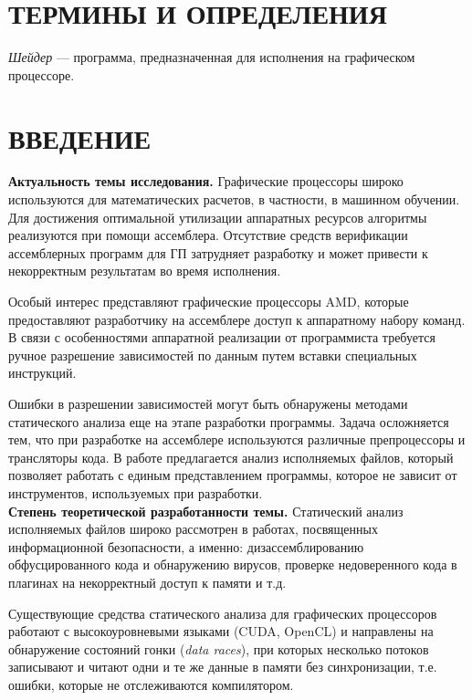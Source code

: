\documentclass[a4paper,14pt]{extarticle}
\newcommand{\topic}[1]{\textbf{#1.}}
\begin{document}
\tableofcontents
\newpage

\section*{ТЕРМИНЫ И ОПРЕДЕЛЕНИЯ}

\textit{Шейдер} — программа, предназначенная для исполнения на графическом процессоре.

\newpage

\section*{ВВЕДЕНИЕ}

\topic{Актуальность темы исследования} Графические процессоры широко используются
для математических расчетов, в частности, в машинном обучении. Для достижения оптимальной
утилизации аппаратных ресурсов алгоритмы реализуются при помощи ассемблера. Отсутствие
средств верификации ассемблерных программ для ГП затрудняет разработку и
может привести к некорректным результатам во время исполнения.

Особый интерес представляют графические процессоры AMD, которые предоставляют разработчику
на ассемблере доступ к аппаратному набору команд. В связи с особенностями аппаратной
реализации от программиста требуется ручное разрешение зависимостей по данным
путем вставки специальных инструкций.

Ошибки в разрешении зависимостей могут быть обнаружены методами статического анализа
еще на этапе разработки программы. Задача осложняется тем, что при разработке
на ассемблере используются различные препроцессоры и трансляторы кода. В работе
предлагается анализ исполняемых файлов, который позволяет работать с единым
представлением программы, которое не зависит от инструментов, используемых при разработки.\\

\topic{Степень теоретической разработанности темы} Статический анализ исполняемых файлов
широко рассмотрен в работах, посвященных информационной безопасности, а именно:
дизассемблированию обфусцированного кода и обнаружению вирусов,
проверке недоверенного кода в плагинах на некорректный доступ к памяти и т.д.\cite{static-analysis-binary}

Существующие средства статического анализа для графических процессоров работают с
высокоуровневыми языками (CUDA, OpenCL) и направлены на обнаружение состояний
гонки (\textit{data races}), при которых несколько потоков записывают
и читают одни и те же данные в памяти без синхронизации, т.е. ошибки, которые
не отслеживаются компилятором\cite{gpu-static-verification}.
\end{document}
